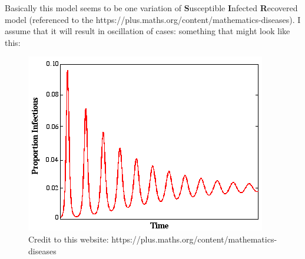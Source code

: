 \begin{homeworkProblem}
Basically this model seems to be one variation of \textbf{S}usceptible 
\textbf{I}nfected \textbf{R}ecovered model (referenced to the {\color{blue} https://plus.maths.org/content/mathematics-diseases}).
I assume that it will result in oscillation of cases: something 
that might look like this:
\begin{figure}[htbp]
    \centering
\includegraphics[scale=0.6]{fig/fig(16)(suppose).png}
\caption{Credit to {\color{blue} this website: https://plus.maths.org/content/mathematics-diseases}}
\end{figure}


\end{homeworkProblem}
